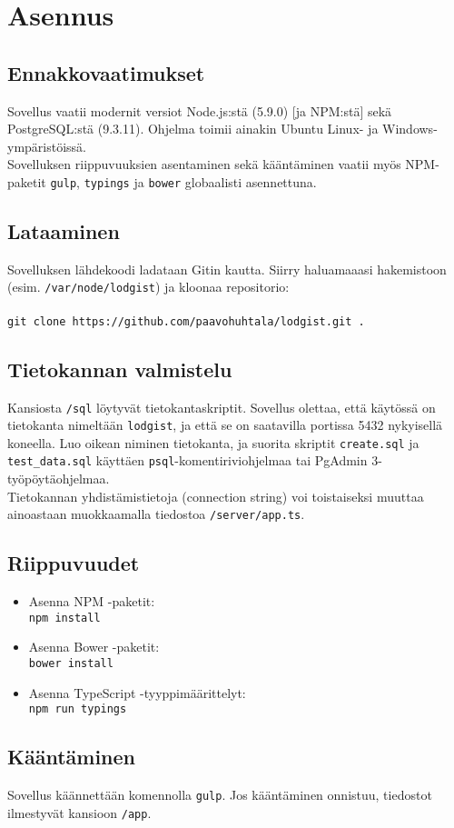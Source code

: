 \chapter{Asennus}

\section{Ennakkovaatimukset}

Sovellus vaatii modernit versiot Node.js:stä (5.9.0) [ja NPM:stä] sekä PostgreSQL:stä (9.3.11). Ohjelma toimii ainakin Ubuntu Linux- ja Windows-ympäristöissä. \\

Sovelluksen riippuvuuksien asentaminen sekä kääntäminen vaatii myös NPM-paketit \texttt{gulp}, \texttt{typings} ja \texttt{bower} globaalisti asennettuna.

\section{Lataaminen}

Sovelluksen lähdekoodi ladataan Gitin kautta. Siirry haluamaaasi hakemistoon (esim. \texttt{/var/node/lodgist}) ja kloonaa repositorio: \\ \\
\texttt{git clone https://github.com/paavohuhtala/lodgist.git .}

\section{Tietokannan valmistelu}

Kansiosta \texttt{/sql} löytyvät tietokantaskriptit. Sovellus olettaa, että käytössä on tietokanta nimeltään \texttt{lodgist}, ja että se on saatavilla portissa 5432 nykyisellä koneella. Luo oikean niminen tietokanta, ja suorita  skriptit \texttt{create.sql} ja \texttt{test\_data.sql} käyttäen \texttt{psql}-komentiriviohjelmaa tai PgAdmin 3- työpöytäohjelmaa.\\

Tietokannan yhdistämistietoja (connection string) voi toistaiseksi muuttaa ainoastaan muokkaamalla tiedostoa \texttt{/server/app.ts}.

\section{Riippuvuudet}

\begin{itemize}
	\item Asenna NPM -paketit: \\ \texttt{npm install}
	\item Asenna Bower -paketit: \\ \texttt{bower install}
	\item Asenna TypeScript -tyyppimäärittelyt: \\ \texttt{npm run typings}
\end{itemize}

\section{Kääntäminen}

Sovellus käännettään komennolla \texttt{gulp}. Jos kääntäminen onnistuu, tiedostot ilmestyvät kansioon \texttt{/app}.

